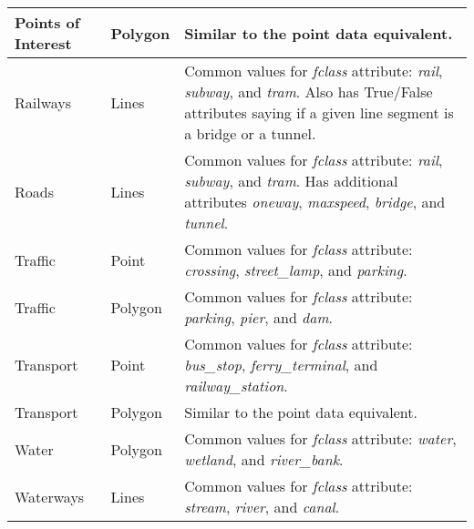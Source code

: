\begin{longtable}{p{3cm}p{2.5cm}p{8cm}}
    \midrule
    Points of Interest & Polygon            & Similar to the point data equivalent.                                                                                                                                               \\
    \midrule
    Railways           & Lines              & Common values for \emph{fclass} attribute: \emph{rail}, \emph{subway}, and \emph{tram}. Also has True/False attributes saying if a given line segment is a bridge or a tunnel.      \\
    \midrule
    Roads              & Lines              & Common values for \emph{fclass} attribute: \emph{rail}, \emph{subway}, and \emph{tram}. Has additional attributes \emph{oneway}, \emph{maxspeed}, \emph{bridge}, and \emph{tunnel}. \\
    \midrule
    Traffic            & Point              & Common values for \emph{fclass} attribute: \emph{crossing}, \emph{street\_lamp}, and \emph{parking}.                                                                                \\
    \midrule
    Traffic            & Polygon            & Common values for \emph{fclass} attribute: \emph{parking}, \emph{pier}, and \emph{dam}.                                                                                             \\
    \midrule
    Transport          & Point              & Common values for \emph{fclass} attribute: \emph{bus\_stop}, \emph{ferry\_terminal}, and \emph{railway\_station}.                                                                   \\
    \midrule
    Transport          & Polygon            & Similar to the point data equivalent.                                                                                                                                               \\
    \midrule
    Water              & Polygon            & Common values for \emph{fclass} attribute: \emph{water}, \emph{wetland}, and \emph{river\_bank}.                                                                                    \\
    \midrule
    Waterways          & Lines              & Common values for \emph{fclass} attribute: \emph{stream}, \emph{river}, and \emph{canal}.                                                                                           \\
\end{longtable}

